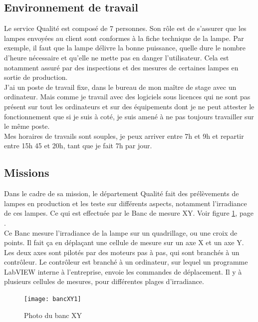 \documentclass[12pt]{article}
\begin{document}
\subsection{Environnement de travail}
Le service Qualité est composé de 7 personnes. 
Son rôle est de s'assurer que les lampes envoyées au client sont conformes à la fiche technique de la lampe.
Par exemple, il faut que la lampe délivre la bonne puissance, quelle dure le nombre d'heure nécessaire et qu'elle ne mette pas en danger l'utilisateur.
Cela est notamment assuré par des inspections et des mesures de certaines lampes en sortie de production.\\
J'ai un poste de travail fixe, dans le bureau de mon maître de stage avec un ordinateur.
Mais comme je travail avec des logiciels sous licences qui ne sont pas présent sur tout les ordinateurs et sur des équipements dont je ne peut attester le fonctionnement que si je suis à coté, je suis amené à ne pas toujours travailler sur le même poste.\\
Mes horaires de travails sont souples, je peux arriver entre 7h et 9h et repartir entre 15h 45 et 20h, tant que je fait 7h par jour.
\newpage

\subsection{Missions}


Dans le cadre de sa mission, le département Qualité fait des prélèvements de lampes en production et les teste sur différents aspects, notamment l'\gls{irradiance} de ces lampes.
Ce qui est effectuée par le Banc de mesure XY.
Voir figure \ref{fig:bancXY1}, page \pageref{fig:bancXY1}.\\
Ce Banc mesure l'irradiance de la lampe sur un quadrillage, ou une croix de points.
Il fait ça en déplaçant une cellule de mesure sur un axe X et un axe Y.
Les deux axes sont pilotés par des moteurs pas à pas, qui sont branchés à un contrôleur.
Le contrôleur est branché à un ordinateur, sur lequel un programme LabVIEW interne à l'entreprise, envoie les commandes de déplacement.
Il y à plusieurs cellules de mesures, pour différentes plages d'irradiance.\\
\begin{figure}[htb]
	\centering
	\texttt{[image: bancXY1]}
	\caption{Photo du banc XY}
	\label{fig:bancXY1}
\end{figure}
\end{document}
